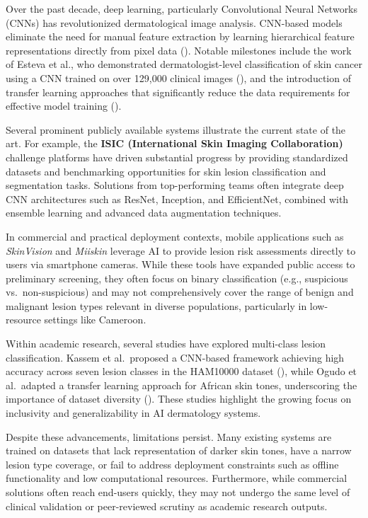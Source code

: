 \documentclass[
  12pt,
  oneside]{article}
\begin{document}
Over the past decade, deep learning, particularly Convolutional Neural
Networks (CNNs) has revolutionized dermatological image analysis.
CNN-based models eliminate the need for manual feature extraction by
learning hierarchical feature representations directly from pixel data
(). Notable milestones
include the work of Esteva et al., who demonstrated dermatologist-level
classification of skin cancer using a CNN trained on over 129,000
clinical images (), and the introduction of transfer learning approaches that
significantly reduce the data requirements for effective model training
().

Several prominent publicly available systems illustrate the current
state of the art. For example, the \textbf{ISIC (International Skin
Imaging Collaboration)} challenge platforms have driven substantial
progress by providing standardized datasets and benchmarking
opportunities for skin lesion classification and segmentation tasks.
Solutions from top-performing teams often integrate deep CNN
architectures such as ResNet, Inception, and EfficientNet, combined with
ensemble learning and advanced data augmentation techniques.

In commercial and practical deployment contexts, mobile applications
such as \emph{SkinVision} and \emph{Miiskin} leverage AI to provide
lesion risk assessments directly to users via smartphone cameras. While
these tools have expanded public access to preliminary screening, they
often focus on binary classification (e.g., suspicious
vs.~non-suspicious) and may not comprehensively cover the range of
benign and malignant lesion types relevant in diverse populations,
particularly in low-resource settings like Cameroon.

Within academic research, several studies have explored multi-class
lesion classification. Kassem et al.~proposed a CNN-based framework
achieving high accuracy across seven lesion classes in the HAM10000
dataset (), while
Ogudo et al.~adapted a transfer learning approach for African skin
tones, underscoring the importance of dataset diversity
(). These studies
highlight the growing focus on inclusivity and generalizability in AI
dermatology systems.

Despite these advancements, limitations persist. Many existing systems
are trained on datasets that lack representation of darker skin tones,
have a narrow lesion type coverage, or fail to address deployment
constraints such as offline functionality and low computational
resources. Furthermore, while commercial solutions often reach end-users
quickly, they may not undergo the same level of clinical validation or
peer-reviewed scrutiny as academic research outputs.
\end{document}
